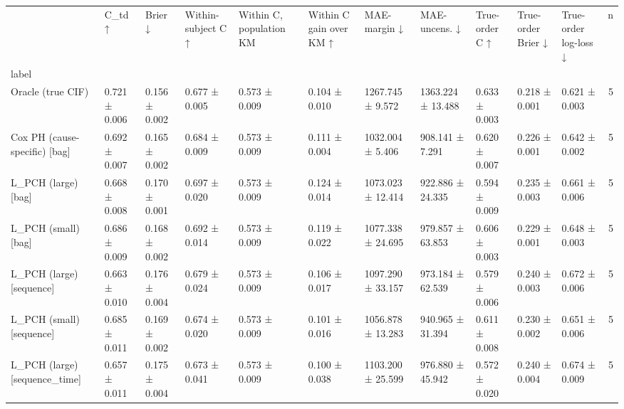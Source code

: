 \begin{tabular}{lllllllllllr}
\toprule
 & C\_td ↑ & Brier ↓ & Within-subject C ↑ & Within C, population KM & Within C gain over KM ↑ & MAE-margin ↓ & MAE-uncens. ↓ & True-order C ↑ & True-order Brier ↓ & True-order log-loss ↓ & n \\
label &  &  &  &  &  &  &  &  &  &  &  \\
\midrule
Oracle (true CIF) & 0.721 ± 0.006 & 0.156 ± 0.002 & 0.677 ± 0.005 & 0.573 ± 0.009 & 0.104 ± 0.010 & 1267.745 ± 9.572 & 1363.224 ± 13.488 & 0.633 ± 0.003 & 0.218 ± 0.001 & 0.621 ± 0.003 & 5 \\
Cox PH (cause-specific) [bag] & 0.692 ± 0.007 & 0.165 ± 0.002 & 0.684 ± 0.009 & 0.573 ± 0.009 & 0.111 ± 0.004 & 1032.004 ± 5.406 & 908.141 ± 7.291 & 0.620 ± 0.007 & 0.226 ± 0.001 & 0.642 ± 0.002 & 5 \\
L\_PCH (large) [bag] & 0.668 ± 0.008 & 0.170 ± 0.001 & 0.697 ± 0.020 & 0.573 ± 0.009 & 0.124 ± 0.014 & 1073.023 ± 12.414 & 922.886 ± 24.335 & 0.594 ± 0.009 & 0.235 ± 0.003 & 0.661 ± 0.006 & 5 \\
L\_PCH (small) [bag] & 0.686 ± 0.009 & 0.168 ± 0.002 & 0.692 ± 0.014 & 0.573 ± 0.009 & 0.119 ± 0.022 & 1077.338 ± 24.695 & 979.857 ± 63.853 & 0.606 ± 0.003 & 0.229 ± 0.001 & 0.648 ± 0.003 & 5 \\
L\_PCH (large) [sequence] & 0.663 ± 0.010 & 0.176 ± 0.004 & 0.679 ± 0.024 & 0.573 ± 0.009 & 0.106 ± 0.017 & 1097.290 ± 33.157 & 973.184 ± 62.539 & 0.579 ± 0.006 & 0.240 ± 0.003 & 0.672 ± 0.006 & 5 \\
L\_PCH (small) [sequence] & 0.685 ± 0.011 & 0.169 ± 0.002 & 0.674 ± 0.020 & 0.573 ± 0.009 & 0.101 ± 0.016 & 1056.878 ± 13.283 & 940.965 ± 31.394 & 0.611 ± 0.008 & 0.230 ± 0.002 & 0.651 ± 0.006 & 5 \\
L\_PCH (large) [sequence\_time] & 0.657 ± 0.011 & 0.175 ± 0.004 & 0.673 ± 0.041 & 0.573 ± 0.009 & 0.100 ± 0.038 & 1103.200 ± 25.599 & 976.880 ± 45.942 & 0.572 ± 0.020 & 0.240 ± 0.004 & 0.674 ± 0.009 & 5 \\
\bottomrule
\end{tabular}

